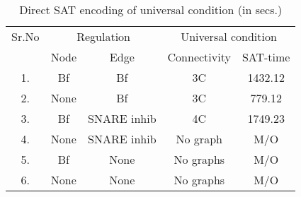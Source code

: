 \begin{table}[t]
	\centering
	    \def\arraystretch{1.1}
		\begin{tabular}[t]{c|c|c|c|c}\hline
			
			{\multirow{2}{*} {Sr.No}}  & \multicolumn{2}{c|}{Regulation} & \multicolumn{2}{c}{Universal condition} 
			
			

			
			\\\cline{2-5}
			{} & {Node} & {Edge} & {Connectivity} & {SAT-time} 
			
			\\\hline
			1. & Bf & Bf & 3C & 1432.12  \\\hline
			2. & None & Bf  & 3C & 779.12 \\\hline
			3. & Bf & SNARE inhib & 4C & 1749.23  \\\hline
			4. & None & SNARE inhib  & No graph & M/O\\\hline
			5. & Bf & None  & No graphs & M/O  \\\hline
			6. &  None & None  & No graphs & M/O \\\hline
			
	\end{tabular}
	\caption{ Direct SAT encoding of universal condition (in secs.)}
	\label{tab:satqbf-graph}
\end{table}